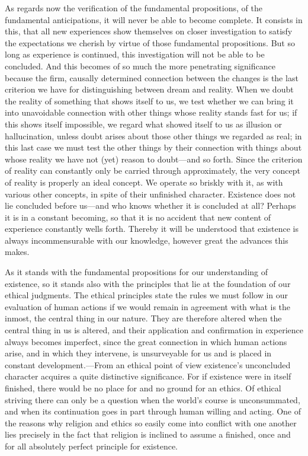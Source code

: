 \documentclass[12pt,a4paper]{book}
\newcommand{\opage}[1]{\marginnote{\footnotesize\textit{[#1]}}}
\begin{document}
As regards now the verification of the fundamental propositions, of the fundamental anticipations,
it will never be able to become complete. It consists in this, that all new experiences show
themselves on closer investigation to satisfy the expectations we cherish by virtue of those
fundamental propositions. But so long as experience is continued, this investigation will not be
able to be concluded. And this becomes of so much the more penetrating significance because the
firm, causally determined connection between the changes is the last criterion we have for
distinguishing between dream and reality. When we doubt the reality of something that shows itself
to us, we test whether we can bring it into unavoidable connection with other things whose reality
stands fast for us; if this shows itself impossible, we regard what showed itself to us as illusion
or hallucination, unless doubt arises about those other things we regarded as real; in this last
case we must test the other things by their connection with things about whose reality we have not
(yet) reason to doubt---and so forth. Since the criterion of reality can constantly only be carried
through approximately, the very concept of reality is properly an ideal concept. We operate so
briskly with it, as with various other concepts, in spite of their unfinished character. Existence
does not lie concluded before us---and who knows whether it is concluded at all? Perhaps it is in a
constant becoming, so that it is no accident that new content of experience constantly wells forth.
Thereby it will be understood that existence is always incommensurable with our knowledge, however
great the advances this makes.

\opage{168}As it stands with the fundamental propositions for our understanding of existence, so it stands also
with the principles that lie at the foundation of our ethical judgments. The ethical principles state
the rules we must follow in our evaluation of human actions if we would remain in agreement with
what is the inmost, the central thing in our nature. They are therefore altered when the central
thing in us is altered, and their application and confirmation in experience always becomes
imperfect, since the great connection in which human actions arise, and in which they intervene, is
unsurveyable for us and is placed in constant development.---From an ethical point of view
existence's unconcluded character acquires a quite distinctive significance. For if existence were
in itself finished, there would be no place for and no ground for an ethics. Of ethical striving
there can only be a question when the world's course is unconsummated, and when its continuation
goes in part through human willing and acting. One of the reasons why religion and ethics so easily
come into conflict with one another lies precisely in the fact that religion is inclined to assume a
finished, once and for all absolutely perfect principle for existence.
\end{document}
